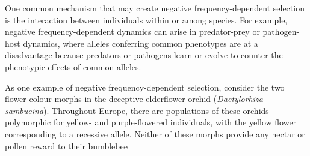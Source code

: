 One common mechanism that may create negative frequency-dependent
selection is the interaction between individuals within or among
species. For example, negative frequency-dependent dynamics can
arise in predator-prey or pathogen-host dynamics, where
alleles conferring common phenotypes are at a disadvantage because 
predators or pathogens learn or evolve to counter the phenotypic effects of
common alleles.

As one example of negative frequency-dependent selection, consider the two flower colour morphs in the
deceptive elderflower orchid ({\it Dactylorhiza
  sambucina}). Throughout Europe, there are populations of these orchids polymorphic for 
yellow- and purple-flowered individuals, with the
yellow flower corresponding to a recessive allele. Neither of
these morphs provide any nectar or pollen reward to their bumblebee
